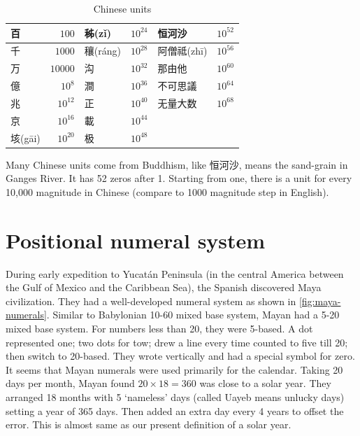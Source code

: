 \documentclass[b5paper]{article}
\begin{document}
\begin{table}[htbp]
  \centering
  \begin{tabular}{|l|r|l|r|l|r|}
  \hline
  百            & $100$      & 秭(z\v{i})    & $10^{24}$ &  恒河沙  & $10^{52}$ \\
  \hline
  千            & $1000$     & 穰(r\'{a}ng)  & $10^{28}$ & 阿僧祗(zh\={i})  & $10^{56}$ \\
  \hline
  万            & $10000$    & 沟            & $10^{32}$ & 那由他        & $10^{60}$  \\
  \hline
  億            & $10^8$     & 澗            & $10^{36}$ &  不可思議      & $10^{64}$ \\
  \hline
  兆            & $10^{12}$  & 正            & $10^{40}$ &  无量大数      & $10^{68}$ \\
  \hline
  京            & $10^{16}$  & 載            & $10^{44}$ &               & \\
  \hline
  垓(g\={a}i)   & $10^{20}$  & 极            & $10^{48}$ &               & \\
  \hline
  \end{tabular}
  \caption{Chinese units}
  \label{tab:units-cn}
\end{table}

Many Chinese units come from Buddhism\cite{Noguchi2007}, like 恒河沙, means the sand-grain in Ganges River. It has 52 zeros after 1. Starting from one, there is a unit for every 10,000 magnitude in Chinese (compare to 1000 magnitude step in English).

\section{Positional numeral system}
  

During early expedition to Yucatán Peninsula (in the central America between the Gulf of Mexico and the Caribbean Sea), the Spanish discovered Maya civilization. They had a well-developed numeral system as shown in \cref{fig:maya-numerals}. Similar to Babylonian 10-60 mixed base system, Mayan had a 5-20 mixed base system. For numbers less than 20, they were 5-based. A dot represented one; two dots for tow; drew a line every time counted to five till 20; then switch to 20-based. They wrote vertically and had a special symbol for zero. It seems that Mayan numerals were used primarily for the calendar. Taking 20 days per month, Mayan found $20 \times 18 = 360$ was close to a solar year. They arranged 18 months with 5 `nameless' days (called Uayeb means unlucky days) setting a year of 365 days. Then added an extra day every 4 years to offset the error. This is almost same as our present definition of a solar year.
\end{document}
